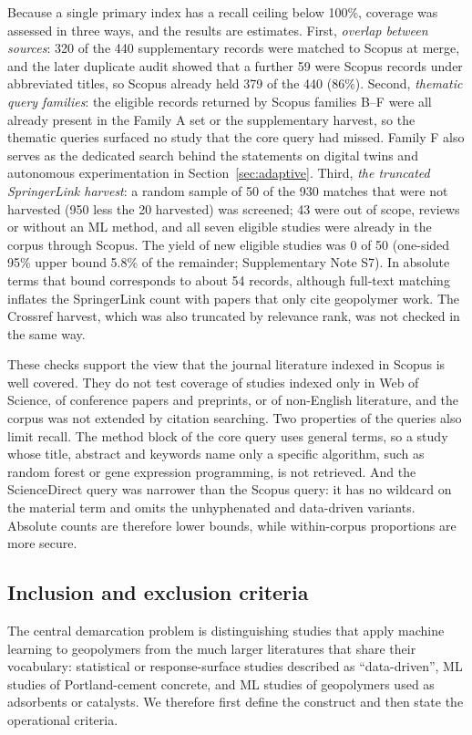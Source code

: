 \documentclass[pdflatex,sn-basic]{sn-jnl}
\begin{document}
Because a single primary index has a recall ceiling below 100\%, coverage was assessed in three ways, and the results are estimates. First, \emph{overlap between sources}: 320 of the 440 supplementary records were matched to Scopus at merge, and the later duplicate audit showed that a further 59 were Scopus records under abbreviated titles, so Scopus already held 379 of the 440 (86\%). Second, \emph{thematic query families}: the eligible records returned by Scopus families B--F were all already present in the Family A set or the supplementary harvest, so the thematic queries surfaced no study that the core query had missed. Family F also serves as the dedicated search behind the statements on digital twins and autonomous experimentation in Section~\ref{sec:adaptive}. Third, \emph{the truncated SpringerLink harvest}: a random sample of 50 of the 930 matches that were not harvested (950 less the 20 harvested) was screened; 43 were out of scope, reviews or without an ML method, and all seven eligible studies were already in the corpus through Scopus. The yield of new eligible studies was 0 of 50 (one-sided 95\% upper bound 5.8\% of the remainder; Supplementary Note S7). In absolute terms that bound corresponds to about 54 records, although full-text matching inflates the SpringerLink count with papers that only cite geopolymer work. The Crossref harvest, which was also truncated by relevance rank, was not checked in the same way.

These checks support the view that the journal literature indexed in Scopus is well covered. They do not test coverage of studies indexed only in Web of Science, of conference papers and preprints, or of non-English literature, and the corpus was not extended by citation searching. Two properties of the queries also limit recall. The method block of the core query uses general terms, so a study whose title, abstract and keywords name only a specific algorithm, such as random forest or gene expression programming, is not retrieved. And the ScienceDirect query was narrower than the Scopus query: it has no wildcard on the material term and omits the unhyphenated and data-driven variants. Absolute counts are therefore lower bounds, while within-corpus proportions are more secure.

\subsection{Inclusion and exclusion criteria}\label{sec:criteria}

The central demarcation problem is distinguishing studies that apply machine learning to geopolymers from the much larger literatures that share their vocabulary: statistical or response-surface studies described as ``data-driven'', ML studies of Portland-cement concrete, and ML studies of geopolymers used as adsorbents or catalysts. We therefore first define the construct and then state the operational criteria.
\end{document}
